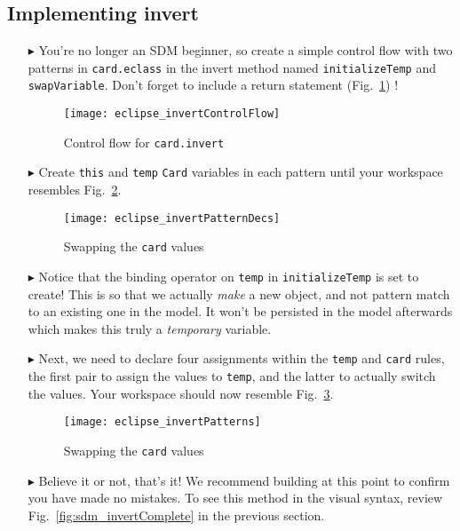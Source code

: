 \newpage
\hypertarget{invertCard tex}{}
\subsection{Implementing invert}
\texHeader

\begin{itemize}

\item[$\blacktriangleright$] You're no longer an SDM beginner, so create a simple control flow with two patterns in \texttt{card.eclass} in the invert
method named \texttt{initializeTemp} and \texttt{swapVariable}. Don't forget to include a return statement (Fig.~\ref{fig:eclipse_invert}) !

\begin{figure}[htbp]
\begin{center}
  \texttt{[image: eclipse\_invertControlFlow]}
  \caption{Control flow for \texttt{card.invert}}  
  \label{fig:eclipse_invert}
\end{center}
\end{figure}

\item[$\blacktriangleright$] Create \texttt{this} and \texttt{temp} \texttt{Card} variables in each pattern until your workspace resembles
Fig.~\ref{fig:invertPatternsDecs}.

\begin{figure}[htbp]
\begin{center}
  \texttt{[image: eclipse\_invertPatternDecs]}
  \caption{Swapping the \texttt{card} values}  
  \label{fig:invertPatternsDecs}
\end{center}
\end{figure}

\item[$\blacktriangleright$] Notice that the binding operator on \texttt{temp} in \texttt{initializeTemp} is set to create! This is so that we actually
\emph{make} a new object, and not pattern match to an existing one in the model. It won't be persisted in the model afterwards which makes this truly a
\emph{temporary} variable.

\item[$\blacktriangleright$] Next, we need to declare four assignments within the \texttt{temp} and \texttt{card} rules, the first pair to assign the values to
\texttt{temp}, and the latter to actually switch the values. Your workspace should now resemble Fig.~\ref{fig:invertPatterns}.

\begin{figure}[htbp]
\begin{center}
  \texttt{[image: eclipse\_invertPatterns]}
  \caption{Swapping the \texttt{card} values}  
  \label{fig:invertPatterns}
\end{center}
\end{figure}

\item[$\blacktriangleright$] Believe it or not, that's it! We recommend building at this point to confirm you have made no mistakes. To
see this method in the visual syntax, review Fig.~\ref{fig:sdm_invertComplete} in the previous section.

\end{itemize}
